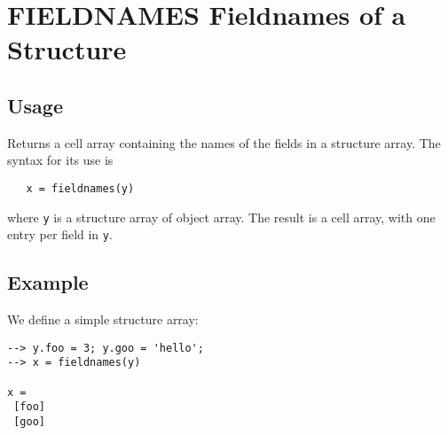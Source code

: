 \section{FIELDNAMES Fieldnames of a Structure}

\subsection{Usage}

Returns a cell array containing the names of the fields in
a structure array.  The syntax for its use is
\begin{verbatim}
   x = fieldnames(y)
\end{verbatim}
where \verb|y| is a structure array of object array.  The result
is a cell array, with one entry per field in \verb|y|.
\subsection{Example}

We define a simple structure array:
\begin{verbatim}
--> y.foo = 3; y.goo = 'hello';
--> x = fieldnames(y)

x = 
 [foo] 
 [goo] 
\end{verbatim}
